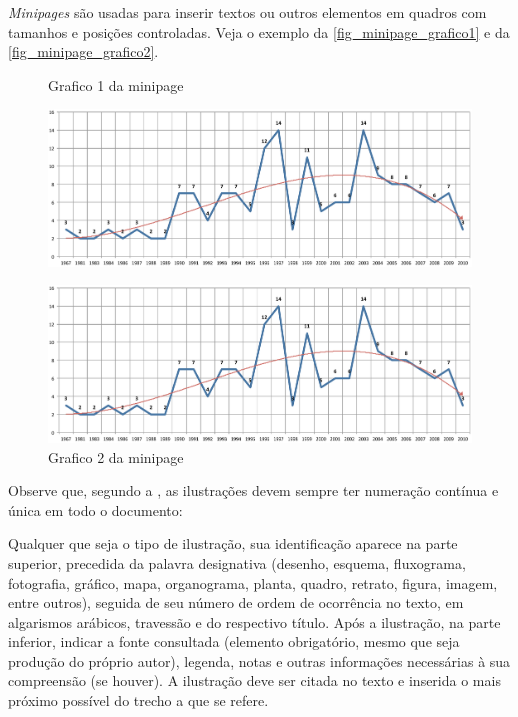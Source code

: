 \emph{Minipages} são usadas para inserir textos ou outros elementos em quadros
com tamanhos e posições controladas. Veja o exemplo da
\autoref{fig_minipage_grafico1} e da \autoref{fig_minipage_grafico2}.

\begin{figure}[htb]
 \label{teste}
 \centering
  \begin{minipage}{0.4\textwidth}
    \centering
    \caption{Grafico 1 da minipage} \label{fig_minipage_grafico1}
    \includegraphics[scale=0.2]{abntex2-modelo-img-grafico.pdf}
  \end{minipage}
  \hfill
  \begin{minipage}{0.4\textwidth}
    \centering
    \caption{Grafico 2 da minipage} \label{fig_minipage_grafico2}
    \includegraphics[scale=0.2]{abntex2-modelo-img-grafico.pdf}
  \end{minipage}
\end{figure}

Observe que, segundo a , as
ilustrações devem sempre ter numeração contínua e única em todo o documento:

\begin{citacao}
Qualquer que seja o tipo de ilustração, sua identificação aparece na parte
superior, precedida da palavra designativa (desenho, esquema, fluxograma,
fotografia, gráfico, mapa, organograma, planta, quadro, retrato, figura,
imagem, entre outros), seguida de seu número de ordem de ocorrência no texto,
em algarismos arábicos, travessão e do respectivo título. Após a ilustração, na
parte inferior, indicar a fonte consultada (elemento obrigatório, mesmo que
seja produção do próprio autor), legenda, notas e outras informações
necessárias à sua compreensão (se houver). A ilustração deve ser citada no
texto e inserida o mais próximo possível do trecho a que se
refere. \cite[seções 5.8]{NBR14724:2011}
\end{citacao}


